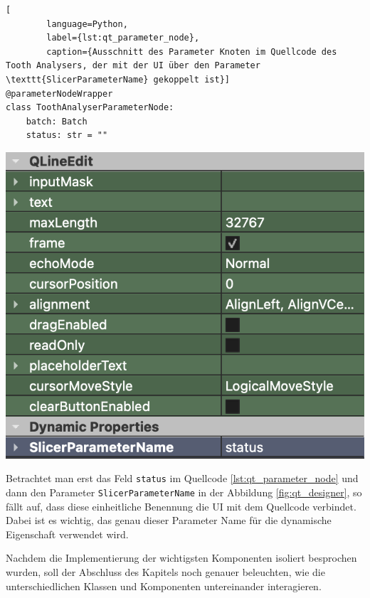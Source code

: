\begin{minipage}{0.55\textwidth}
	\centering
	\begin{lstlisting}[
		language=Python,
		label={lst:qt_parameter_node},
		caption={Ausschnitt des Parameter Knoten im Quellcode des Tooth Analysers, der mit der UI über den Parameter \texttt{SlicerParameterName} gekoppelt ist}]
@parameterNodeWrapper
class ToothAnalyserParameterNode:
    batch: Batch
    status: str = ""
    \end{lstlisting}
\end{minipage}
\hfill
\begin{minipage}{0.35\textwidth}
	\centering
	\includegraphics[width=\textwidth]{img/qt_designer.png}
	 \label{fig:qt_designer}
\end{minipage}

Betrachtet man erst das Feld \texttt{status} im Quellcode \ref{lst:qt_parameter_node}
und dann den Parameter \texttt{SlicerParameterName} in der Abbildung
\ref{fig:qt_designer}, so fällt auf, dass diese einheitliche Benennung die \ac{UI}
mit dem Quellcode verbindet. Dabei ist es wichtig, das genau dieser Parameter Name
für die dynamische Eigenschaft verwendet wird.

Nachdem die Implementierung der wichtigsten Komponenten isoliert besprochen wurden,
soll der Abschluss des Kapitels noch genauer beleuchten, wie die unterschiedlichen
Klassen und Komponenten untereinander interagieren.

